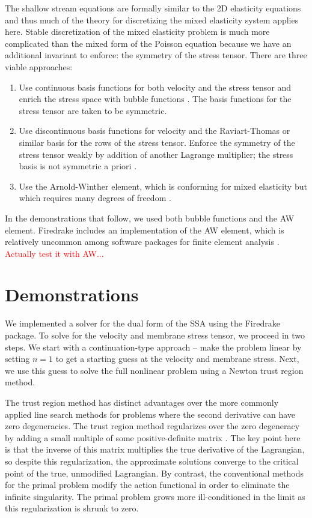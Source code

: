 \documentclass{article}
\theoremstyle{definition}
\theoremstyle{plain}
\begin{document}
The shallow stream equations are formally similar to the 2D elasticity equations and thus much of the theory for discretizing the mixed elasticity system applies here.
Stable discretization of the mixed elasticity problem is much more complicated than the mixed form of the Poisson equation because we have an additional invariant to enforce: the symmetry of the stress tensor.
There are three viable approaches:
\begin{enumerate}
    \item Use continuous basis functions for both velocity and the stress tensor and enrich the stress space with bubble functions \citep{brezzi1993mixed}.
        The basis functions for the stress tensor are taken to be symmetric.
    \item Use discontinuous basis functions for velocity and the Raviart-Thomas or similar basis for the rows of the stress tensor.
        Enforce the symmetry of the stress tensor weakly by addition of another Lagrange multiplier; the stress basis is not symmetric a priori \citep{arnold1984peers}.
    \item Use the Arnold-Winther element, which is conforming for mixed elasticity but which requires many degrees of freedom \citep{arnold2002mixed}.
\end{enumerate}
In the demonstrations that follow, we used both bubble functions and the AW element.
Firedrake includes an implementation of the AW element, which is relatively uncommon among software packages for finite element analysis \citep{aznaran2021transformations}.
\textcolor{red}{Actually test it with AW...}


\section{Demonstrations}

We implemented a solver for the dual form of the SSA using the Firedrake package.
To solve for the velocity and membrane stress tensor, we proceed in two steps.
We start with a continuation-type approach -- make the problem linear by setting $n = 1$ to get a starting guess at the velocity and membrane stress.
Next, we use this guess to solve the full nonlinear problem using a Newton trust region method.

The trust region method has distinct advantages over the more commonly applied line search methods for problems where the second derivative can have zero degeneracies.
The trust region method regularizes over the zero degeneracy by adding a small multiple of some positive-definite matrix \citep{conn2000trust}.
The key point here is that the inverse of this matrix multiplies the true derivative of the Lagrangian, so despite this regularization, the approximate solutions converge to the critical point of the true, unmodified Lagrangian.
By contrast, the conventional methods for the primal problem modify the action functional in order to eliminate the infinite singularity.
The primal problem grows more ill-conditioned in the limit as this regularization is shrunk to zero.
\end{document}
